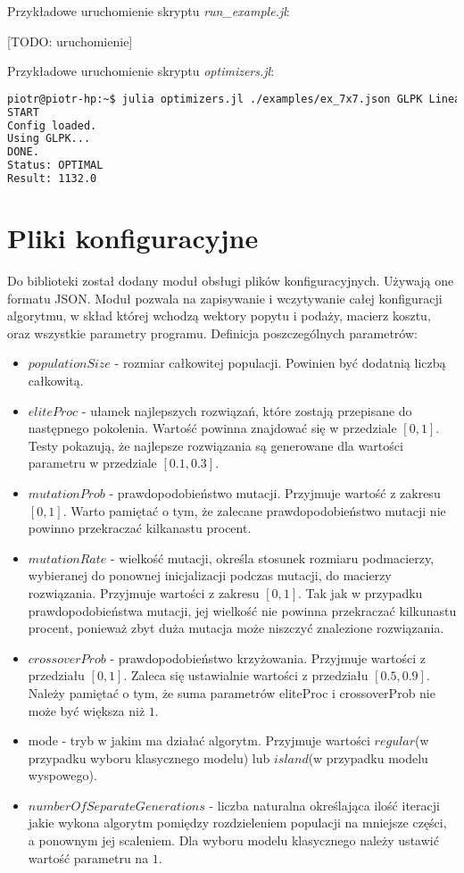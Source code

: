 Przykładowe uruchomienie skryptu \textit{run\_example.jl}:

[TODO: uruchomienie]

Przykładowe uruchomienie skryptu \textit{optimizers.jl}:

\begin{lstlisting}[language=bash, frame=single]
piotr@piotr-hp:~$ julia optimizers.jl ./examples/ex_7x7.json GLPK Linear
START
Config loaded.
Using GLPK...
DONE.
Status: OPTIMAL
Result: 1132.0
\end{lstlisting}

\section{Pliki konfiguracyjne}

Do biblioteki został dodany moduł obsługi plików konfiguracyjnych. Używają one formatu JSON. Moduł pozwala na zapisywanie i wczytywanie 
całej konfiguracji algorytmu, w skład której wchodzą wektory popytu i podaży, macierz kosztu, oraz wszystkie parametry programu.
Definicja poszczególnych parametrów:

\begin{itemize}
    \item $populationSize$ - rozmiar całkowitej populacji. Powinien być dodatnią liczbą całkowitą.
    \item $eliteProc$ - ułamek najlepszych rozwiązań, które zostają przepisane do następnego pokolenia. 
    Wartość powinna znajdować się w przedziale $[0, 1]$. Testy pokazują, że najlepsze rozwiązania są generowane dla wartości parametru w przedziale
    $[0.1, 0.3]$.
    \item $mutationProb$ - prawdopodobieństwo mutacji. Przyjmuje wartość z zakresu $[0, 1]$. Warto pamiętać o tym, że zalecane prawdopodobieństwo 
    mutacji nie powinno przekraczać kilkanastu procent.
    \item $mutationRate$ - wielkość mutacji, określa stosunek rozmiaru podmacierzy, wybieranej do ponownej inicjalizacji podczas mutacji, 
    do macierzy rozwiązania. Przyjmuje wartości z zakresu $[0, 1]$. Tak jak w przypadku prawdopodobieństwa mutacji, jej wielkość nie powinna 
    przekraczać kilkunastu procent, ponieważ zbyt duża mutacja może niszczyć znalezione rozwiązania.
    \item $crossoverProb$ - prawdopodobieństwo krzyżowania. Przyjmuje wartości z przedziału $[0, 1]$. Zaleca się ustawialnie wartości z przedziału 
    $[0.5, 0.9]$. Należy pamiętać o tym, że suma parametrów eliteProc i crossoverProb nie może być większa niż $1$.
    \item mode - tryb w jakim ma działać algorytm. Przyjmuje wartości $regular$(w przypadku wyboru klasycznego modelu) lub $island$(w przypadku 
    modelu wyspowego).
    \item $numberOfSeparateGenerations$ - liczba naturalna określająca ilość iteracji jakie wykona algorytm pomiędzy rozdzieleniem populacji na 
    mniejsze części, a ponownym jej scaleniem. Dla wyboru modelu klasycznego należy ustawić wartość parametru na $1$.
\end{itemize}

